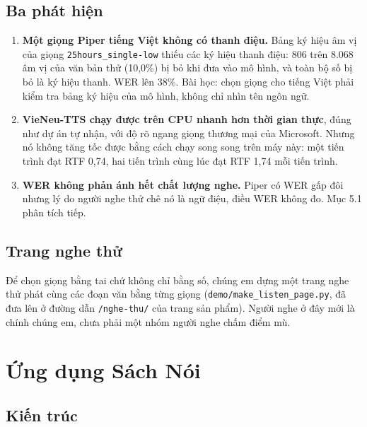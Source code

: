 \documentclass[12pt,a4paper]{article}
\providecommand{\tightlist}{\setlength{\itemsep}{2pt}\setlength{\parskip}{0pt}}
\begin{document}
\subsection{Ba phát hiện}\label{sec:phat-hien}

\begin{enumerate}
\def\labelenumi{\arabic{enumi}.}
\tightlist
\item
  \textbf{Một giọng Piper tiếng Việt không có thanh điệu.} Bảng ký hiệu âm vị của giọng \texttt{25hours\_single-low} thiếu các ký hiệu thanh điệu: 806 trên 8.068 âm vị của văn bản thử (10,0\%) bị bỏ khi đưa vào mô hình, và toàn bộ số bị bỏ là ký hiệu thanh. WER lên 38\%. Bài học: chọn giọng cho tiếng Việt phải kiểm tra bảng ký hiệu của mô hình, không chỉ nhìn tên ngôn ngữ.
\item
  \textbf{VieNeu-TTS chạy được trên CPU nhanh hơn thời gian thực}, đúng như dự án tự nhận, với độ rõ ngang giọng thương mại của Microsoft. Nhưng nó không tăng tốc được bằng cách chạy song song trên máy này: một tiến trình đạt RTF 0,74, hai tiến trình cùng lúc đạt RTF 1,74 mỗi tiến trình.
\item
  \textbf{WER không phản ánh hết chất lượng nghe.} Piper có WER gấp đôi nhưng lý do người nghe thử chê nó là ngữ điệu, điều WER không đo. Mục 5.1 phân tích tiếp.
\end{enumerate}

\subsection{Trang nghe thử}

Để chọn giọng bằng tai chứ không chỉ bằng số, chúng em dựng một trang nghe thử phát cùng các đoạn văn bằng từng giọng (\texttt{demo/make\_listen\_page.py}, đã đưa lên ở đường dẫn \texttt{/nghe-thu/} của trang sản phẩm). Người nghe ở đây mới là chính chúng em, chưa phải một nhóm người nghe chấm điểm mù.

\section{Ứng dụng Sách Nói}

\subsection{Kiến trúc}
\end{document}
